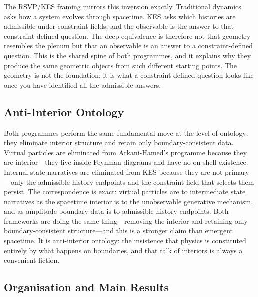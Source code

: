 \documentclass[12pt, oneside]{amsart}
\theoremstyle{plain}
\theoremstyle{definition}
\theoremstyle{remark}
\begin{document}
The RSVP/KES framing mirrors this inversion exactly. Traditional dynamics asks how a system evolves through spacetime. KES asks which histories are admissible under constraint fields, and the observable is the answer to that constraint-defined question. The deep equivalence is therefore not that geometry resembles the plenum but that an observable is an answer to a constraint-defined question. This is the shared spine of both programmes, and it explains why they produce the same geometric objects from such different starting points. The geometry is not the foundation; it is what a constraint-defined question looks like once you have identified all the admissible answers.

\subsection{Anti-Interior Ontology}

Both programmes perform the same fundamental move at the level of ontology: they eliminate interior structure and retain only boundary-consistent data. Virtual particles are eliminated from Arkani-Hamed's programme because they are interior---they live inside Feynman diagrams and have no on-shell existence. Internal state narratives are eliminated from KES because they are not primary---only the admissible history endpoints and the constraint field that selects them persist. The correspondence is exact: virtual particles are to intermediate state narratives as the spacetime interior is to the unobservable generative mechanism, and as amplitude boundary data is to admissible history endpoints. Both frameworks are doing the same thing---removing the interior and retaining only boundary-consistent structure---and this is a stronger claim than emergent spacetime. It is anti-interior ontology: the insistence that physics is constituted entirely by what happens on boundaries, and that talk of interiors is always a convenient fiction.

\subsection{Organisation and Main Results}
\end{document}
